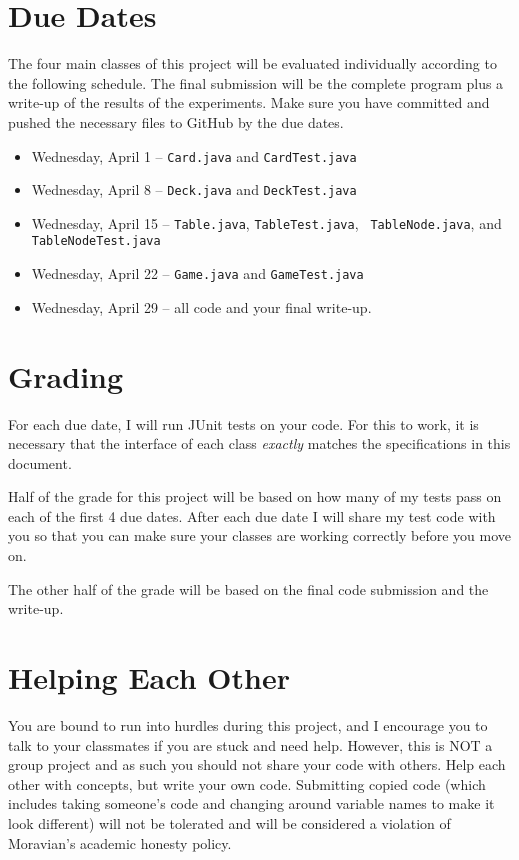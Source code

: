 \documentclass[11pt]{article}
\begin{document}
\section*{Due Dates}

The four main classes of this project will be evaluated individually according
to the following schedule. The final submission will be the complete program
plus a write-up of the results of the experiments. Make sure you have committed
and pushed the necessary files to GitHub by the due dates.

\begin{itemize}
\item Wednesday, April 1 -- {\tt Card.java} and {\tt CardTest.java}
\item Wednesday, April 8 -- {\tt Deck.java} and {\tt DeckTest.java}
\item Wednesday, April 15 -- {\tt Table.java}, {\tt TableTest.java}, {\tt
    TableNode.java}, and {\tt TableNodeTest.java}
\item Wednesday, April 22 -- {\tt Game.java} and {\tt GameTest.java}
\item Wednesday, April 29 -- all code and your final write-up.
\end{itemize}

\section*{Grading}

For each due date, I will run JUnit tests on your code. For this to work, it is
necessary that the interface of each class {\em exactly} matches the
specifications in this document.

Half of the grade for this project will be based on how many of my tests pass
on each of the first 4 due dates. After each due date I will share my test code
with you so that you can make sure your classes are working correctly before
you move on.

The other half of the grade will be based on the final code submission and the
write-up.

\section*{Helping Each Other}

You are bound to run into hurdles during this project, and I encourage you to
talk to your classmates if you are stuck and need help. However, this is NOT a
group project and as such you should not share your code with others. Help each
other with concepts, but write your own code. Submitting copied code (which
includes taking someone's code and changing around variable names to make it
look different) will not be tolerated and will be considered a violation of
Moravian's academic honesty policy.
\end{document}
